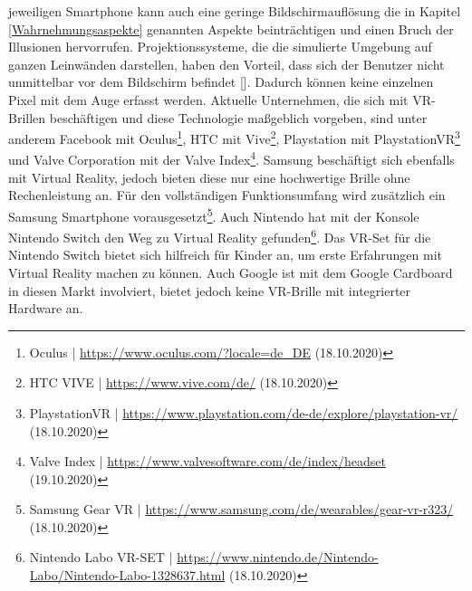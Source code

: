 \documentclass[a4paper,12pt,oneside]{article}
\begin{document}
        jeweiligen Smartphone kann 
        auch eine geringe
        Bildschirmauflösung die in Kapitel \ref{Wahrnehmungsaspekte} genannten Aspekte
        beinträchtigen und einen Bruch der Illusionen hervorrufen.
        Projektionssysteme, die die simulierte Umgebung auf ganzen Leinwänden darstellen,
        haben den Vorteil, dass sich der Benutzer nicht unmittelbar vor dem Bildschirm
        befindet [\cite[134]{Dorner2013}]. Dadurch können keine einzelnen Pixel mit dem Auge 
        erfasst werden.
        Aktuelle Unternehmen, die sich mit VR-Brillen beschäftigen und diese Technologie
        maßgeblich vorgeben, sind unter anderem Facebook mit Oculus\footnote{Oculus | \url{https://www.oculus.com/?locale=de_DE} (18.10.2020)}, 
        HTC mit Vive\footnote{HTC VIVE | \url{https://www.vive.com/de/} (18.10.2020)},
        Playstation mit PlaystationVR\footnote{PlaystationVR | \url{https://www.playstation.com/de-de/explore/playstation-vr/} (18.10.2020)}
        und Valve Corporation mit der Valve Index\footnote{Valve Index | \url{https://www.valvesoftware.com/de/index/headset} (19.10.2020)}.
        Samsung beschäftigt sich ebenfalls mit Virtual
        Reality, jedoch bieten diese nur eine hochwertige Brille ohne Rechenleistung an.
        Für den vollständigen Funktionsumfang wird zusätzlich ein Samsung Smartphone vorausgesetzt\footnote{Samsung Gear VR | \url{https://www.samsung.com/de/wearables/gear-vr-r323/} (18.10.2020)}.
        Auch Nintendo hat mit der Konsole Nintendo Switch den Weg zu Virtual Reality
        gefunden\footnote{Nintendo Labo VR-SET | \url{https://www.nintendo.de/Nintendo-Labo/Nintendo-Labo-1328637.html} (18.10.2020)}.
        Das VR-Set für die Nintendo Switch bietet sich hilfreich für Kinder an, um erste 
        Erfahrungen mit Virtual Reality machen zu können.
        Auch Google ist mit dem Google Cardboard in diesen Markt involviert, bietet jedoch keine 
        VR-Brille mit integrierter Hardware an.
\end{document}
